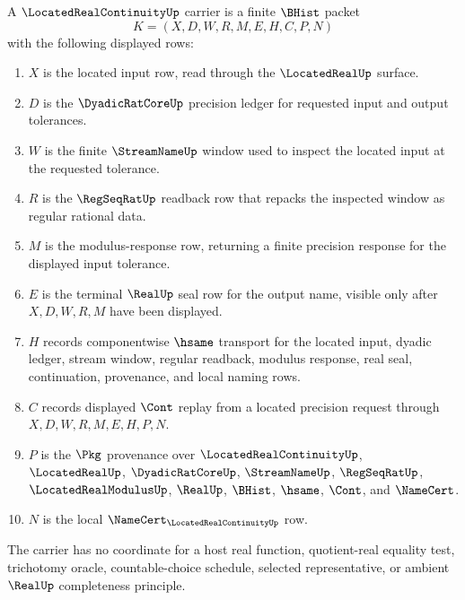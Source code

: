 \begin{definition}
\label{def:located-real-continuity-carrier}
A $\LocatedRealContinuityUp$ carrier is a finite $\BHist$ packet
$$
K=(X,D,W,R,M,E,H,C,P,N)
$$
with the following displayed rows:
\begin{enumerate}
\item $X$ is the located input row, read through the $\LocatedRealUp$ surface.
\item $D$ is the $\DyadicRatCoreUp$ precision ledger for requested input and output tolerances.
\item $W$ is the finite $\StreamNameUp$ window used to inspect the located input at the requested tolerance.
\item $R$ is the $\RegSeqRatUp$ readback row that repacks the inspected window as regular rational data.
\item $M$ is the modulus-response row, returning a finite precision response for the displayed input tolerance.
\item $E$ is the terminal $\RealUp$ seal row for the output name, visible only after $X,D,W,R,M$ have been displayed.
\item $H$ records componentwise $\hsame$ transport for the located input, dyadic ledger, stream window, regular readback, modulus response, real seal, continuation, provenance, and local naming rows.
\item $C$ records displayed $\Cont$ replay from a located precision request through $X,D,W,R,M,E,H,P,N$.
\item $P$ is the $\Pkg$ provenance over $\LocatedRealContinuityUp$, $\LocatedRealUp$, $\DyadicRatCoreUp$, $\StreamNameUp$, $\RegSeqRatUp$, $\LocatedRealModulusUp$, $\RealUp$, $\BHist$, $\hsame$, $\Cont$, and $\NameCert$.
\item $N$ is the local $\NameCert_{\LocatedRealContinuityUp}$ row.
\end{enumerate}
The carrier has no coordinate for a host real function, quotient-real equality test, trichotomy oracle, countable-choice schedule, selected representative, or ambient $\RealUp$ completeness principle.
\end{definition}

